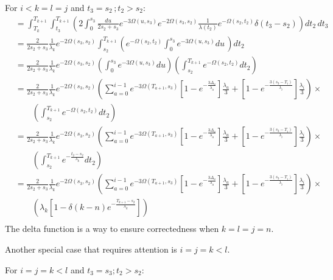 \documentclass{article}
\begin{document}
For $i<k=l=j$ and $t_3=s_2\,;t_2>s_2$:
\begin{align*}
    &=\int_{T_k}^{T_{k+1}}\int_{t_3}^{T_{k+1}}\left(2\int_0^{s_3}\frac{du}{2s_2+s_3}e^{-3\Omega(u,s_3)}e^{-2\Omega(s_3,s_2)}\frac{1}{\lambda(t_2)}e^{-\Omega(s_2,t_2)}\delta(t_3-s_2)\right)dt_2\,dt_3\\
    &=\frac{2}{2s_2+s_3}\frac{1}{\lambda_k}e^{-2\Omega(s_3,s_2)}\int_{s_2}^{T_{k+1}}\left(e^{-\Omega(s_2,t_2)}\int_0^{s_3}e^{-3\Omega(u,s_3)}du\,\right)dt_2\\
    &=\frac{2}{2s_2+s_3}\frac{1}{\lambda_k}e^{-2\Omega(s_3,s_2)}\left(\int_0^{s_3}e^{-3\Omega(u,s_3)}du\right)\left(\int_{s_2}^{T_{k+1}}e^{-\Omega(s_2,t_2)}dt_2\right)\\
    &=\frac{2}{2s_2+s_3}\frac{1}{\lambda_k}e^{-2\Omega(s_3,s_2)}\left(
    \sum_{a=0}^{i-1} e^{-3\Omega(T_{a+1},s_3)}
    \left[1-e^{-\frac{3 \Delta_a}{\lambda_a}}\right]\frac{\lambda_a}{3}+
    \left[1-e^{-\frac{3 \left(s_3-T_{i}\right)}{\lambda_{i}}}\right]\frac{\lambda_{i}}{3}
    \right)\times\\
    &\qquad\left(\int_{s_2}^{T_{k+1}}e^{-\Omega(s_2,t_2)}dt_2\right)\\
    &=\frac{2}{2s_2+s_3}\frac{1}{\lambda_k}e^{-2\Omega(s_3,s_2)}\left(
    \sum_{a=0}^{i-1} e^{-3\Omega(T_{a+1},s_3)}
    \left[1-e^{-\frac{3 \Delta_a}{\lambda_a}}\right]\frac{\lambda_a}{3}+
    \left[1-e^{-\frac{3 \left(s_3-T_{i}\right)}{\lambda_{i}}}\right]\frac{\lambda_{i}}{3}
    \right)\times\\
    &\qquad\left(
    \int_{s_2}^{T_{k+1}}e^{-\frac{t_2-s_2}{\lambda_k}}dt_2
    \right)\\
    &=\frac{2}{2s_2+s_3}\frac{1}{\lambda_k}e^{-2\Omega(s_3,s_2)}\left(
    \sum_{a=0}^{i-1} e^{-3\Omega(T_{a+1},s_3)}
    \left[1-e^{-\frac{3 \Delta_a}{\lambda_a}}\right]\frac{\lambda_a}{3}+
    \left[1-e^{-\frac{3 \left(s_3-T_{i}\right)}{\lambda_{i}}}\right]\frac{\lambda_{i}}{3}
    \right)\times\\
    &\qquad\left(
    \lambda_k\left[1-\delta(k-n)e^{-\frac{T_{k+1}-s_2}{\lambda_k}}\right]
    \right)\\
\end{align*}
The delta function is a way to ensure correctedness when $k=l=j=n$.

Another special case that requires attention is $i=j=k<l$.

For $i=j=k<l$ and $t_3=s_3;t_2>s_2$:
\end{document}
